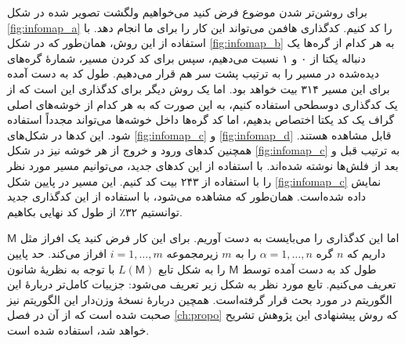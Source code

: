 برای روشن‌تر شدن موضوع فرض کنید می‌خواهیم ولگشت تصویر شده در شکل \ref{fig:infomap_a} را کد کنیم. کدگذاری هافمن می‌تواند این کار را برای ما انجام دهد. با استفاده از این روش، همان‌طور که در شکل \ref{fig:infomap_b} به هر کدام از گره‌ها یک دنباله یکتا از ۰ و ۱ نسبت می‌دهیم، سپس برای کد کردن مسیر، شمارهٔ گره‌های دیده‌شده در مسیر را به ترتیب پشت سر هم قرار می‌دهیم. طول کد به دست آمده برای این مسیر ۳۱۴ بیت خواهد بود. اما یک روش دیگر برای کدگذاری این است که از یک کدگذاری دوسطحی استفاده کنیم، به این صورت که به هر کدام از خوشه‌های اصلی گراف یک کد یکتا اختصاص بدهیم، اما کد گره‌ها داخل خوشه‌ها می‌تواند مجدداً استفاده شود. این کدها در شکل‌های \ref{fig:infomap_c} و \ref{fig:infomap_d} قابل مشاهده هستند. همچنین کدهای ورود و خروج از هر خوشه نیز در شکل \ref{fig:infomap_c} به ترتیب قبل و بعد از فلش‌ها نوشته شده‌اند. با استفاده از این کدهای جدید، می‌توانیم مسیر مورد نظر را با استفاده از ۲۴۳ بیت کد کنیم. این مسیر در پایین شکل \ref{fig:infomap_c} نمایش داده شده‌است. همان‌طور که مشاهده می‌شود، با استفاده از این کدگذاری جدید توانستیم ۳۲٪ از طول کد نهایی بکاهیم.

اما این کدگذاری را می‌بایست به دست آوریم. برای این کار فرض کنید یک افراز مثل $\textsf{M}$ داریم که $n$ گره
$\alpha = 1,\ldots,n$
را به $m$ زیرمجموعه
$i = 1,\ldots,m$
افراز می‌کند. حد پایین طول کد به دست آمده توسط $\textsf{M}$ را به شکل تابع $L(\textsf{M})$ با توجه به نظریهٔ شانون تعریف می‌کنیم. تابع مورد نظر به شکل زیر تعریف می‌شود:
جزییات کامل‌تر دربارهٔ این الگوریتم در \cite{rosvall2010map} مورد بحث قرار گرفته‌است. همچین دربارهٔ نسخهٔ وزن‌دار این الگوریتم نیز صحبت شده است که از آن در فصل \ref{ch:propo} که روش پیشنهادی این پژوهش تشریح خواهد شد، استفاده شده است.




